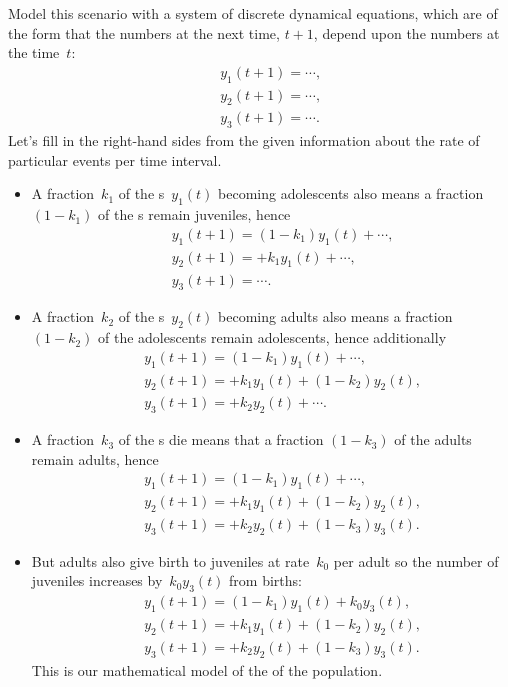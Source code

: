 Model this scenario with a system of discrete dynamical equations, which are of the form that the numbers at the next time, \(t+1\), depend upon the numbers at the time~\(t\):
\begin{eqnarray*}&&
{y_1(t+1)}=\cdots,
\\&&{y_2(t+1)}=\cdots,
\\&&{y_3(t+1)}=\cdots.
\end{eqnarray*}
Let's fill in the right-hand sides from the given information about the rate of particular events per time interval.
\begin{itemize}
\item A fraction~\(k_1\) of the s~\(y_1(t)\) becoming adolescents also means a fraction \((1-k_1)\) of the s remain juveniles, hence
\begin{eqnarray*}&&
{y_1(t+1)}=(1-k_1)y_1(t)+\cdots,
\\&&{y_2(t+1)}=+k_1y_1(t)+\cdots,
\\&&{y_3(t+1)}=\cdots.
\end{eqnarray*}
\item A fraction~\(k_2\) of the s~\(y_2(t)\) becoming adults also means a fraction \((1-k_2)\)  of the adolescents remain adolescents, hence additionally
\begin{eqnarray*}&&
{y_1(t+1)}=(1-k_1)y_1(t)+\cdots,
\\&&{y_2(t+1)}=+k_1y_1(t)+(1-k_2)y_2(t),
\\&&{y_3(t+1)}=+k_2y_2(t)+\cdots.
\end{eqnarray*}
\item A fraction~\(k_3\) of the s die means that a fraction \((1-k_3)\) of the adults remain adults, hence
\begin{eqnarray*}&&
{y_1(t+1)}=(1-k_1)y_1(t)+\cdots,
\\&&{y_2(t+1)}=+k_1y_1(t)+(1-k_2)y_2(t),
\\&&{y_3(t+1)}=+k_2y_2(t)+(1-k_3)y_3(t).
\end{eqnarray*}
\item But adults also give birth to juveniles at rate~\(k_0\) per adult so the number of juveniles increases by~\(k_0y_3(t)\) from births:
\begin{eqnarray*}&&
{y_1(t+1)}=(1-k_1)y_1(t)+k_0y_3(t),
\\&&{y_2(t+1)}=+k_1y_1(t)+(1-k_2)y_2(t),
\\&&{y_3(t+1)}=+k_2y_2(t)+(1-k_3)y_3(t).
\end{eqnarray*}
This is our mathematical model of the  of the {population}.
\end{itemize}

